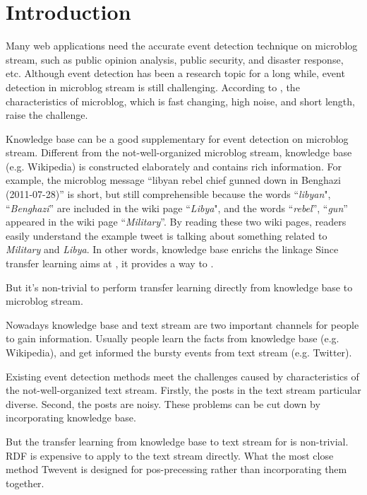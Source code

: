 \documentclass{article}
\begin{document}
\section{Introduction}
Many web applications need the accurate event detection technique on microblog stream, such as public opinion analysis\cite{thelwall2011sentiment}, public security\cite{Li:2012gw}, and disaster response\cite{Yin:2012ht}, etc.
Although event detection has been a research topic for a long while\cite{allan1998topic}, event detection in microblog stream is still challenging\cite{atefeh2015survey}.
According to \cite{huang2016probabilistic}, the characteristics of microblog, which is fast changing, high noise, and short length, raise the challenge.

Knowledge base can be a good supplementary for event detection on microblog stream.
Different from the not-well-organized microblog stream, knowledge base (e.g. Wikipedia) is constructed elaborately and contains rich information. 
For example, the microblog message ``libyan rebel chief gunned down in Benghazi (2011-07-28)'' is short, but still comprehensible because the words ``\textit{libyan}", ``\textit{Benghazi}'' are included in the wiki page ``\textit{Libya}", and the words ``\textit{rebel}'', ``\textit{gun}'' appeared in the wiki page ``\textit{Military}''.
By reading these two wiki pages, readers easily understand the example tweet is talking about something related to \textit{Military} and \textit{Libya}.
In other words, knowledge base enrichs the linkage
Since transfer learning aims at , it provides a way to .

But it's non-trivial to perform transfer learning directly from knowledge base to microblog stream.

Nowadays knowledge base and text stream are two important channels for people to gain information. 
Usually people learn the facts from knowledge base (e.g. Wikipedia), and get informed the bursty events from text stream (e.g. Twitter).

Existing event detection methods meet the challenges caused by characteristics of the not-well-organized text stream.
Firstly, the posts in the text stream particular diverse.
Second, the posts are noisy. 
These problems can be cut down by incorporating knowledge base. 

But the transfer learning from knowledge base to text stream for is non-trivial.
RDF is expensive to apply to the text stream directly.
What the most close method Twevent is designed for pos-precessing rather than incorporating them together.
\end{document}
